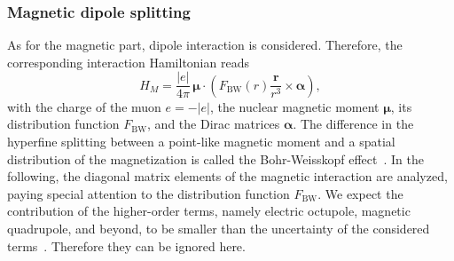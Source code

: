 \subsubsection{Magnetic dipole splitting}
\label{sec:magndip}
As for the magnetic part, dipole interaction is considered. Therefore, the corresponding interaction Hamiltonian reads~\cite{Elizarov2005}
\begin{equation}
\label{eq:Hmag}
H_{M} = \frac{|e|}{4 \pi}\,\boldsymbol{\mu}\cdot \left( F_{\text{BW}}(r) \frac{\mathbf{r}}{r^3} \times \boldsymbol{\alpha} \right),
\end{equation}
with the charge of the muon $e=-|e|$, the nuclear magnetic moment $\boldsymbol{\mu}$, its distribution function $F_{\text{BW}}$, and the Dirac matrices $\boldsymbol{\alpha}$.
The difference in the hyperfine splitting between a point-like magnetic moment and a spatial distribution of the magnetization is called the Bohr-Weisskopf effect~\cite{bohrWeisskopf1950}. In the following, the diagonal matrix elements of the magnetic interaction are analyzed, paying special attention to the distribution function $F_{\text{BW}}$. We expect the contribution of the higher-order terms, namely electric octupole, magnetic quadrupole, and beyond, to be smaller than the uncertainty of the considered terms~\cite{Devons1995,Steffen1985}. Therefore they can be ignored here.

